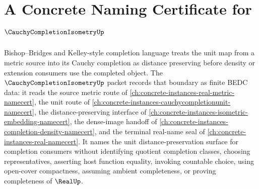 \chapter{A Concrete Naming Certificate for $\CauchyCompletionIsometryUp$}
\label{ch:concrete-instances-cauchy-completion-isometry-namecert}

Bishop--Bridges and Kelley-style completion language treats the unit map from a metric source into its Cauchy completion as distance preserving before density or extension consumers use the completed object. The $\CauchyCompletionIsometryUp$ packet records that boundary as finite BEDC data: it reads the source metric route of \autoref{ch:concrete-instances-real-metric-namecert}, the unit route of \autoref{ch:concrete-instances-cauchycompletionunit-namecert}, the distance-preserving interface of \autoref{ch:concrete-instances-isometric-embedding-namecert}, the dense-image handoff of \autoref{ch:concrete-instances-completion-density-namecert}, and the terminal real-name seal of \autoref{ch:concrete-instances-real-namecert}. It names the unit distance-preservation surface for completion consumers without identifying quotient completion classes, choosing representatives, asserting host function equality, invoking countable choice, using open-cover compactness, assuming ambient completeness, or proving completeness of $\RealUp$.

